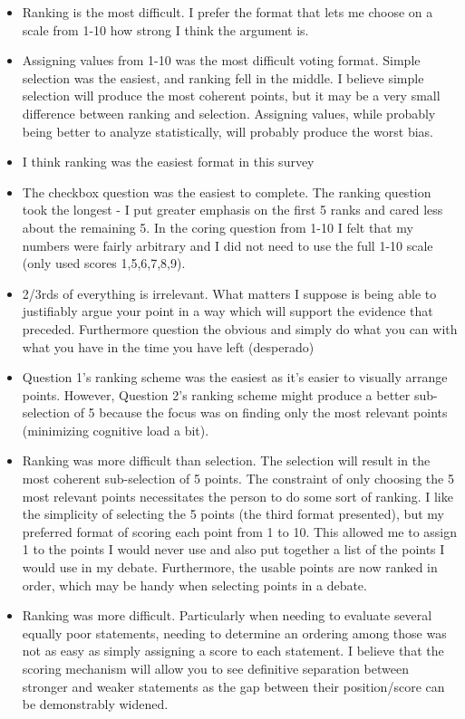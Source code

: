 \documentclass[10pt]{article}
\begin{document}
\begin{itemize}
\item Ranking is the most difficult.  I prefer the format that lets me choose on a scale from 1-10 how strong I think the argument is.  
\item Assigning values from 1-10 was the most difficult voting format.  Simple selection was the easiest, and ranking fell in the middle.  I believe simple selection will produce the most coherent points, but it may be a very small difference between ranking and selection.  Assigning values, while probably being better to analyze statistically, will probably produce the worst bias.
\item I think ranking was the easiest format in this survey
\item The checkbox question was the easiest to complete. The ranking question took the longest - I put greater emphasis on the first 5 ranks and cared less about the remaining 5. In the coring question from 1-10 I felt  that my numbers were fairly arbitrary and I did not need to use the full 1-10 scale (only used scores 1,5,6,7,8,9). 
\item 2/3rds of everything is irrelevant. What matters I suppose is being able to justifiably argue your point in a way which will support the evidence that preceded. Furthermore question the obvious and simply do what you can with what you have in the time you have left (desperado)
\item Question 1's ranking scheme was the easiest as it's easier to visually arrange points. However, Question 2's ranking scheme might produce a better sub-selection of 5 because the focus was on finding only the most relevant points (minimizing cognitive load a bit). 
\item Ranking was more difficult than selection. The selection will result in the most coherent sub-selection of 5 points. The constraint of only choosing the 5 most relevant points necessitates the person to do some sort of ranking. I like the simplicity of selecting the 5 points (the third format presented), but my preferred format of scoring each point from 1 to 10. This allowed me to assign 1 to the points I would never use and also put together a list of the points I would use in my debate. Furthermore, the usable points are now ranked in order, which may be handy when selecting points in a debate.
\item Ranking was more difficult. Particularly when needing to evaluate several equally poor statements, needing to determine an ordering among those was not as easy as simply assigning a score to each statement. I believe that the scoring mechanism will allow you to see definitive separation between stronger and weaker statements as the gap between their position/score can be demonstrably widened.

\end{itemize}
\end{document}
